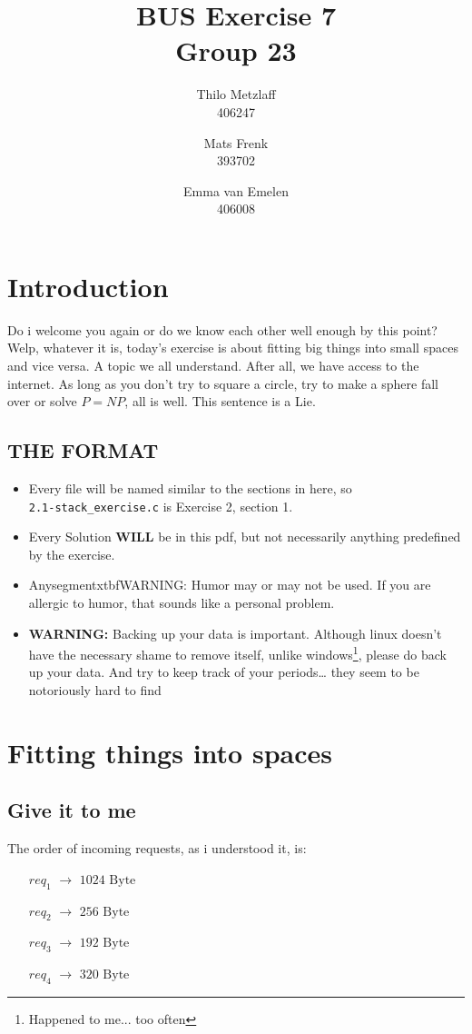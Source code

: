 \documentclass[a4paper, 11pt]{article}
\author{Thilo Metzlaff\\406247 \and Mats Frenk\\393702\and Emma van Emelen\\406008}
\title{BUS Exercise 7 \\ Group 23}
\begin{document}
    \maketitle
    \newpage

    \tableofcontents
    \newpage

    \section*{Introduction}
    Do i welcome you again or do we know each other well enough by this point? Welp, whatever it is, today's exercise is about fitting big things into small spaces and vice versa.
    A topic we all understand. After all, we have access to the internet. As long as you don't try to square a circle, try to make a sphere fall over or solve $P=NP$, all is well.
    This sentence is a Lie.  

    \subsection*{THE FORMAT}
    \begin{itemize}
      \item Every file will be named similar to the sections in here, so\\
      \texttt{2.1-stack\_exercise.c} is Exercise 2, section 1.
      \item Every Solution \textbf{WILL} be in this pdf, but not necessarily 
            anything predefined by the exercise.
      \item Anysegmentxtbf{WARNING:} Humor may or may not be used. If you are allergic
            to humor, that sounds like a personal problem.
      \item \textbf{WARNING:} Backing up your data is important. Although linux 
            doesn't have the necessary shame to remove itself, unlike windows\footnote{Happened to me... too often},
            please do back up your data. And try to keep track of your periods\dots
            they seem to be notoriously hard to find
    \end{itemize}
    \newpage
    
    \section{Fitting things into spaces}
    \subsection{Give it to me}
    The order of incoming requests, as i understood it, is:
    \begin{enumerate}[leftmargin=\parindent+.4in]
          \item[$req_1$ $\rightarrow$] $1024 \mbox{ Byte}$
          \item[$req_2$ $\rightarrow$] $256 \mbox{ Byte}$
          \item[$req_3$ $\rightarrow$] $192 \mbox{ Byte}$
          \item[$req_4$ $\rightarrow$] $320 \mbox{ Byte}$ 
    \end{enumerate}
    
\end{document}
